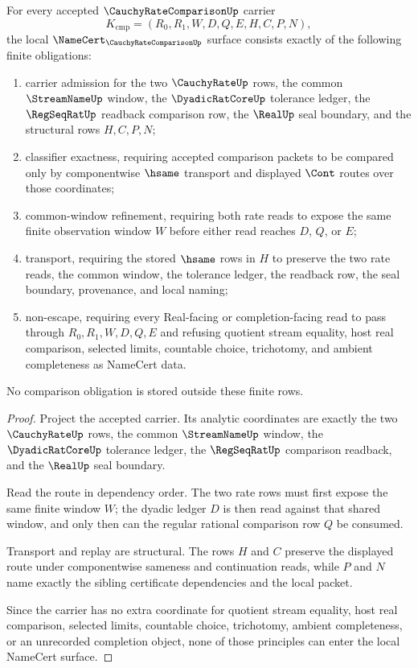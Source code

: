 \begin{theorem}
\label{thm:cauchy-rate-comparison-namecert-obligations}
For every accepted $\CauchyRateComparisonUp$ carrier
$$
K_{\mathrm{cmp}}=(R_0,R_1,W,D,Q,E,H,C,P,N),
$$
the local $\NameCert_{\CauchyRateComparisonUp}$ surface consists exactly of the following finite obligations:
\begin{enumerate}
\item carrier admission for the two $\CauchyRateUp$ rows, the common $\StreamNameUp$ window, the $\DyadicRatCoreUp$ tolerance ledger, the $\RegSeqRatUp$ readback comparison row, the $\RealUp$ seal boundary, and the structural rows $H,C,P,N$;
\item classifier exactness, requiring accepted comparison packets to be compared only by componentwise $\hsame$ transport and displayed $\Cont$ routes over those coordinates;
\item common-window refinement, requiring both rate reads to expose the same finite observation window $W$ before either read reaches $D$, $Q$, or $E$;
\item transport, requiring the stored $\hsame$ rows in $H$ to preserve the two rate reads, the common window, the tolerance ledger, the readback row, the seal boundary, provenance, and local naming;
\item non-escape, requiring every Real-facing or completion-facing read to pass through $R_0,R_1,W,D,Q,E$ and refusing quotient stream equality, host real comparison, selected limits, countable choice, trichotomy, and ambient completeness as NameCert data.
\end{enumerate}
No comparison obligation is stored outside these finite rows.
\end{theorem}
\begin{proof}
Project the accepted carrier. Its analytic coordinates are exactly the two $\CauchyRateUp$ rows, the common $\StreamNameUp$ window, the $\DyadicRatCoreUp$ tolerance ledger, the $\RegSeqRatUp$ comparison readback, and the $\RealUp$ seal boundary.

Read the route in dependency order. The two rate rows must first expose the same finite window $W$; the dyadic ledger $D$ is then read against that shared window, and only then can the regular rational comparison row $Q$ be consumed.

Transport and replay are structural. The rows $H$ and $C$ preserve the displayed route under componentwise sameness and continuation reads, while $P$ and $N$ name exactly the sibling certificate dependencies and the local packet.

Since the carrier has no extra coordinate for quotient stream equality, host real comparison, selected limits, countable choice, trichotomy, ambient completeness, or an unrecorded completion object, none of those principles can enter the local NameCert surface.
\end{proof}

